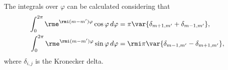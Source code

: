
The integrals over $\varphi$ can be calculated considering that
%
\begin{align}
\int_0^{2\pi} \rme^{\rmi (m-m^{\prime}) \varphi} \cos\varphi  \, d\varphi &= \pi \var{ \delta_{m+1, m^{\prime}} + \delta_{m-1, m^{\prime}} },\\
\int_0^{2\pi} \rme^{\rmi (m-m^{\prime}) \varphi} \sin\varphi  \, d\varphi &= \rmi \pi \var{ \delta_{m-1, m^{\prime}} - \delta_{m+1, m^{\prime}} },
\end{align}
%
where $\delta_{i,j}$ is the Kronecker delta. %
%
%
%

